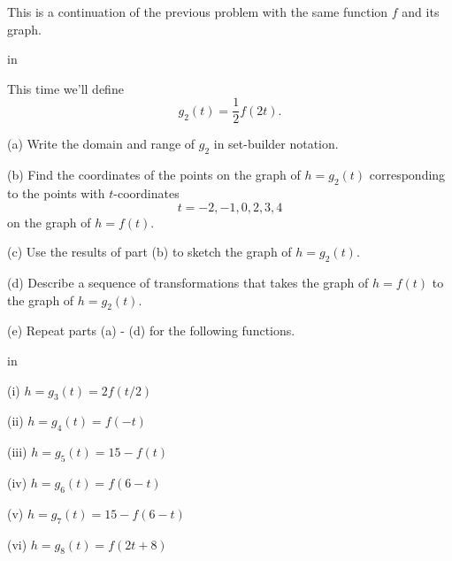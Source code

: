 \documentclass{ximera}
\newcommand{\pskip}{\vskip 0.1 in}
\begin{document}
\begin{question}  \label{Q:vvvcccc}
This is a continuation of the previous problem with the same function $f$ and its graph.

\pskip

This time we'll define 
\[
     g_2(t) = \frac{1}{2}f(2t) .
\]

(a) Write the domain and range of $g_2$ in set-builder notation.

(b) Find the coordinates of the points on the graph of $h=g_2(t)$ corresponding to the points with $t$-coordinates
\[
 t = -2, -1, 0, 2, 3, 4
\]
on the graph of $h=f(t)$.

(c) Use the results of part (b) to sketch the graph of $h=g_2(t)$.

(d) Describe a sequence of transformations that takes the graph of $h=f(t)$ to the graph of $h=g_2(t)$.

(e) Repeat parts (a) - (d) for the following functions.

\pskip


(i)  $h=g_3(t) = 2f(t/2)$

(ii) $h = g_4(t) = f(-t)$

(iii) $h = g_5(t) = 15 - f(t)$

(iv) $h = g_6(t) = f(6-t)$

(v) $h = g_7(t) = 15 - f(6-t)$

(vi) $h=g_8(t) = f(2t+8)$



\end{question}
\end{document}
